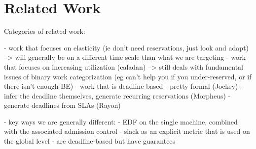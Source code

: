 \section{Related Work}

Categories of related work: 

- work that focuses on elasticity (ie don't need reservations, just look and adapt) --> will generally be on a different time scale than what we are targeting
- work that focuses on increasing utilization (caladan) --> still deals with fundamental issues of binary work categorization (eg can't help you if you under-reserved, or if there isn't enough BE)
- work that is deadline-based
    - pretty formal (Jockey)
    - infer the deadline themselves, generate recurring reservations (Morpheus)
    - generate deadlines from SLAs (Rayon)

- key ways we are generally different:
    - EDF on the single machine, combined with the associated admission control
    - slack as an explicit metric that is used on the global level
    - are deadline-based but have guarantees

